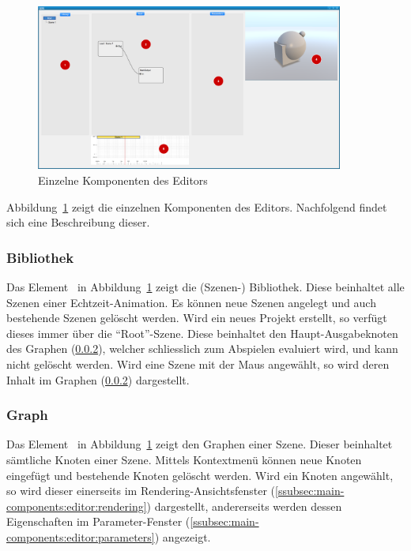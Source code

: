 \begin{figure}[H]
    \centering
    \includegraphics[width=0.9\textwidth]{img/editor_components.png}
    \caption{Einzelne Komponenten des Editors
        \protect\footnotemark}\label{fig:main-components:editor:editor-components}
\end{figure}

Abbildung~\ref{fig:main-components:editor:editor-components} zeigt die
einzelnen Komponenten des Editors. Nachfolgend findet sich eine Beschreibung
dieser.

\subsubsection{Bibliothek}
\label{ssubsec:main-components:editor:library}

Das Element~ in
Abbildung~\ref{fig:main-components:editor:editor-components} zeigt die (Szenen-)
Bibliothek. Diese beinhaltet alle Szenen einer Echtzeit-Animation. Es können
neue Szenen angelegt und auch bestehende Szenen gelöscht werden. Wird ein neues
Projekt erstellt, so verfügt dieses immer über die ``Root''-Szene. Diese
beinhaltet den Haupt-Ausgabeknoten des Graphen
(\ref{ssubsec:main-components:editor:graph}), welcher schliesslich zum
Abspielen evaluiert wird, und kann nicht gelöscht werden. Wird eine Szene mit
der Maus angewählt, so wird deren Inhalt im Graphen
(\ref{ssubsec:main-components:editor:graph}) dargestellt.

\subsubsection{Graph}
\label{ssubsec:main-components:editor:graph}

Das Element~ in
Abbildung~\ref{fig:main-components:editor:editor-components} zeigt den Graphen
einer Szene. Dieser beinhaltet sämtliche Knoten einer Szene. Mittels
Kontextmenü können neue Knoten eingefügt und bestehende Knoten gelöscht werden.
Wird ein Knoten angewählt, so wird dieser einerseits im
Rendering-Ansichtsfenster (\ref{ssubsec:main-components:editor:rendering})
dargestellt, andererseits werden dessen Eigenschaften im Parameter-Fenster
(\ref{ssubsec:main-components:editor:parameters}) angezeigt.

